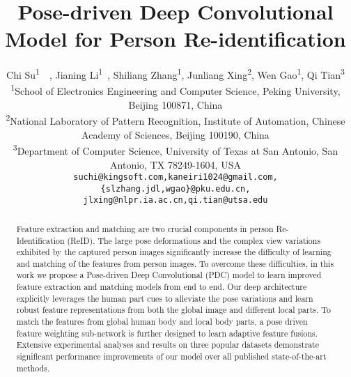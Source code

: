 \documentclass[10pt,twocolumn,letterpaper]{article}
\begin{document}
\title{Pose-driven Deep Convolutional Model for Person Re-identification}

\author{Chi Su\textsuperscript{1}\footnotemark[1]~\footnotemark[2]~, Jianing Li\textsuperscript{1}\footnotemark[1]~, Shiliang Zhang\textsuperscript{1}, Junliang Xing\textsuperscript{2}, Wen Gao\textsuperscript{1}, Qi Tian\textsuperscript{3}\\
\normalsize{\textsuperscript{1}School of Electronics Engineering and Computer Science, Peking University, Beijing 100871, China}\\
\normalsize{\textsuperscript{2}National Laboratory of Pattern Recognition, Institute of Automation, Chinese Academy of Sciences, Beijing 100190, China}\\
\normalsize{\textsuperscript{3}Department of Computer Science, University of Texas at San Antonio, San Antonio, TX 78249-1604, USA}\\
{\tt\small suchi@kingsoft.com,kaneiri1024@gmail.com,\{slzhang.jdl,wgao\}@pku.edu.cn,}\\
{\tt\small jlxing@nlpr.ia.ac.cn,qi.tian@utsa.edu}
}


\renewcommand{\thefootnote}{\fnsymbol{footnote}}
\maketitle
{}
\begin{abstract}
Feature extraction and matching are two crucial components in person Re-Identification (ReID). The large pose deformations and the complex view variations exhibited by the captured person images significantly increase the difficulty of learning and matching of the features from person images. To overcome these difficulties, in this work we propose a Pose-driven Deep Convolutional (PDC) model to learn improved feature extraction and matching models from end to end. Our deep architecture explicitly leverages the human part cues to alleviate the pose variations and learn robust feature representations from both the global image and different local parts. To match the features from global human body and local body parts, a pose driven feature weighting sub-network is further designed to learn adaptive feature fusions. Extensive experimental analyses and results on three popular datasets demonstrate significant performance improvements of our model over all published state-of-the-art methods.
\end{abstract}
\end{document}

